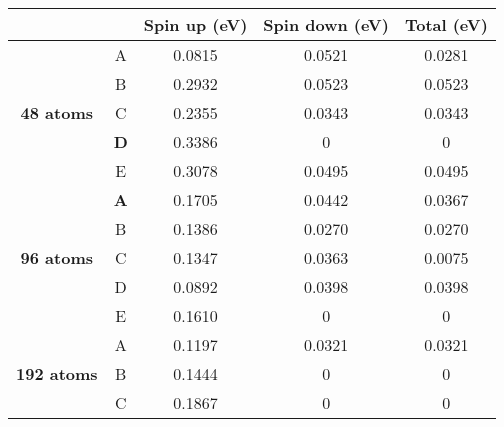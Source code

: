 \begin{table}[H]
\centering
\begin{tabular}{@{}ccccc@{}}
\toprule
                                                     &   & Spin up (eV) & Spin down (eV) & Total (eV) \\ \midrule
\multicolumn{1}{c|}{\multirow{5}{*}{\textbf{48 atoms}}}   
												  & A & 0.0815                & 0.0521                  & 0.0281              \\
\multicolumn{1}{c|}{}                                & B & 0.2932                & 0.0523                  & 0.0523              \\
\multicolumn{1}{c|}{}                                & C & 0.2355                & 0.0343                  & 0.0343              \\
\multicolumn{1}{c|}{}                                & \textbf{D} & 0.3386                & 0                       & 0                   \\
\multicolumn{1}{c|}{}                                & E & 0.3078                & 0.0495                  & 0.0495              \\ \midrule
\multicolumn{1}{c|}{\multirow{5}{*}{\textbf{96 atoms}}}   
                                                     & \textbf{A} & 0.1705                & 0.0442                  & 0.0367              \\ 
\multicolumn{1}{c|}{}                                & B & 0.1386                & 0.0270                  & 0.0270                   \\
\multicolumn{1}{c|}{}                                & C & 0.1347                & 0.0363                  & 0.0075                   \\
\multicolumn{1}{c|}{}                                & D & 0.0892                & 0.0398                  & 0.0398                   \\
\multicolumn{1}{c|}{}                                & E & 0.1610                & 0                       & 0                        \\ \midrule
\multicolumn{1}{c|}{\multirow{5}{*}{\textbf{192 atoms}}}
	 									           & A & 0.1197                & 0.0321                  & 0.0321                   \\
\multicolumn{1}{c|}{}                                & B & 0.1444                & 0                       & 0                        \\
\multicolumn{1}{c|}{}                                & C & 0.1867                & 0                       & 0                   \\

\end{tabular}
\end{table}
